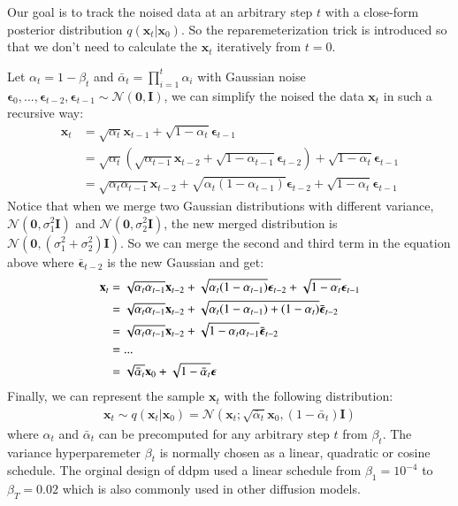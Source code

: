 \documentclass[12pt,DIV14,BCOR12mm,a4paper,footinclude=false,headinclude,parskip=half-,twoside,openright,cleardoublepage=empty,toc=index,bibliography=totoc,listof=totoc]{scrreprt}
\numberwithin{equation}{chapter}
\begin{document}
Our goal is to track the noised data at an arbitrary step $t$ with a close-form posterior distribution $q(\mathbf{x}_{t}|\mathbf{x}_{0})$. So the reparemeterization trick is introduced so that we don't need to calculate the $\mathbf{x}_{t}$ iteratively from $t=0$.

Let $\alpha_{t} = 1 - \beta_{t}$ and $\bar{\alpha}_{t} = \prod_{i=1}^{t}\alpha_{i}$ with Gaussian noise $\boldsymbol{\epsilon}_{0},...,\boldsymbol{\epsilon}_{t-2},\boldsymbol{\epsilon}_{t-1} \sim \mathcal{N}(\mathbf{0}, \mathbf{I})$, we can simplify the noised the data $\mathbf{x}_{t}$ in such a recursive way:
\begin{align*}
  \mathbf{x}_{t} &= \sqrt{\alpha_{t}}\mathbf{x}_{t-1} + \sqrt{1-\alpha_{t}}\boldsymbol{\epsilon}_{t-1}\\
                 &= \sqrt{\alpha_{t}}(\sqrt{\alpha_{t-1}}\mathbf{x}_{t-2} + \sqrt{1-\alpha_{t-1}}\boldsymbol{\epsilon}_{t-2}) + \sqrt{1-\alpha_{t}}\boldsymbol{\epsilon}_{t-1}\\
                 &= \sqrt{\alpha_{t}\alpha_{t-1}}\mathbf{x}_{t-2} + \sqrt{\alpha_{t}(1-\alpha_{t-1})}\boldsymbol{\epsilon}_{t-2} + \sqrt{1-\alpha_{t}}\boldsymbol{\epsilon}_{t-1}
\end{align*}
Notice that when we merge two Gaussian distributions with different variance, $\mathcal{N} (\mathbf{0}, \sigma^{2}_{1}\mathbf{I})$ and $\mathcal{N} (\mathbf{0}, \sigma^{2}_{2}\mathbf{I})$, the new merged distribution is $\mathcal{N} (\mathbf{0}, (\sigma^{2}_{1} + \sigma^{2}_{2})\mathbf{I})$. So we can merge the second and third term in the equation above where $\bar{\boldsymbol{\epsilon}}_{t-2}$ is the new Gaussian and get:
\begin{align}\label{eq:xt_x0}
  \mathbf{x}_{t} &= \sqrt{\alpha_{t}\alpha_{t-1}}\mathbf{x}_{t-2} + \sqrt{\alpha_{t}(1-\alpha_{t-1})}\boldsymbol{\epsilon}_{t-2} + \sqrt{1-\alpha_{t}}\boldsymbol{\epsilon}_{t-1}\notag\\
                 &= \sqrt{\alpha_{t}\alpha_{t-1}}\mathbf{x}_{t-2} + \sqrt{\alpha_{t}(1-\alpha_{t-1}) + (1-\alpha_{t})}\bar{\boldsymbol{\epsilon}}_{t-2}\notag\\
                 &= \sqrt{\alpha_{t}\alpha_{t-1}}\mathbf{x}_{t-2} + \sqrt{1-\alpha_{t}\alpha_{t-1}}\bar{\boldsymbol{\epsilon}}_{t-2}\notag\\
                 &=...\notag\\
                 &= \sqrt{\bar{\alpha}_{t}}\mathbf{x}_{0} + \sqrt{1-\bar{\alpha}_{t}}\boldsymbol{\epsilon} 
\end{align}
Finally, we can represent the sample $\mathbf{x}_{t}$ with the following distribution:
\begin{align}
  \mathbf{x}_{t} \sim q(\mathbf{x}_{t}|\mathbf{x}_{0}) = \mathcal{N}(\mathbf{x}_{t}; \sqrt{\bar{\alpha}_{t}}\mathbf{x}_{0}, (1-\bar{\alpha}_{t})\mathbf{I})
\end{align}
where $\alpha_{t}$ and $\bar{\alpha}_{t}$ can be precomputed for any arbitrary step $t$ from $\beta_{t}$. The variance hyperparemeter $\beta_{t}$ is normally chosen as a linear, quadratic or cosine schedule. The orginal design of \gls{ddpm} used a linear schedule from $\beta_{1} = 10^{-4}$ to $\beta_{T} = 0.02$ which is also commonly used in other diffusion models.
\end{document}
